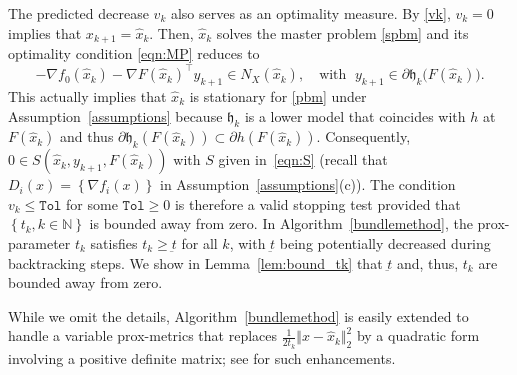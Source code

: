 \documentclass[smallextended,envcountsect]{svjour3}
\newcommand{\norm}[1]{\textstyle{\Vert} #1 \textstyle{\Vert}_2}
\newcommand{\col}[1]{\left\{#1\right\}}
\newcommand{\tol}{\texttt{Tol}}
\newcommand{\modelh}{\mathfrak{h}}
\newcommand{\nats}{\mathbb{N}}
\begin{document}
The predicted decrease $v_k$ also serves as an optimality measure. By \eqref{vk}, $v_k=0$ implies that $x_{k+1}=\hat x_k$. Then, $\hat x_k$ solves the master problem \eqref{spbm} and its optimality condition \eqref{eqn:MP} reduces to
\[
-\nabla f_0(\hat x_{k}) - \nabla F(\hat x_k)^\top y_{k+1} \in N_X(\hat x_{k}),\quad\mbox{with }\; y_{k+1} \in \partial \modelh_k\big(F(\hat x_k)\big).
\]
This actually implies that $\hat x_k$ is stationary for \eqref{pbm} under Assumption~\ref{assumptions} because $\modelh_k$ is a lower model that coincides with $h$ at $F(\hat x_k)$ and thus $\partial \modelh_k(F(\hat x_k)) \subset \partial h(F(\hat x_k))$. Consequently, $0\in S(\hat x_k,y_{k+1},F(\hat x_k))$ with $S$ given in~\eqref{eqn:S} (recall that $D_i(x)=\col{\nabla f_i(x)}$ in Assumption~\ref{assumptions}(c)). The condition $v_k\leq \tol$ for some $\tol\geq 0$ is therefore a valid stopping test provided that $\col{t_k, k\in\nats}$ is bounded away from zero.  In Algorithm~\ref{bundlemethod}, the prox-parameter $t_k$ satisfies $t_k\geq \underbar{t}$ for all $k$, with
$\underbar{t}$ being potentially decreased during backtracking steps. We show in Lemma~\ref{lem:bound_tk} that $\underbar{t}$ and, thus, $t_k$ are bounded away from zero.

While we omit the details, Algorithm~\ref{bundlemethod} is easily extended to handle a variable prox-metrics that replaces $\frac{1}{2t_k} \norm{x - \hat{x}_k}^2$ by a quadratic form involving a positive definite matrix; see \cite{Sagastizabal_2013} for such enhancements. 
\end{document}
